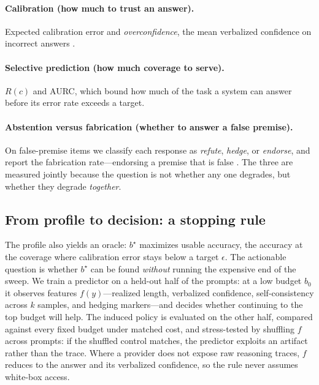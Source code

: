 \documentclass[11pt]{article}
\begin{document}
\paragraph{Calibration (how much to trust an answer).}
Expected calibration error \citep{Guo2017ECE} and \emph{overconfidence}, the
mean verbalized confidence on incorrect answers
\citep{Kadavath2022KnowWhatTheyKnow, Tian2023JustAsk, Xiong2023Confidence}.
\paragraph{Selective prediction (how much coverage to serve).}
$R(c)$ and AURC, which bound how much of the task a system can answer before
its error rate exceeds a target.
\paragraph{Abstention versus fabrication (whether to answer a false premise).}
On false-premise items we classify each response as \emph{refute},
\emph{hedge}, or \emph{endorse}, and report the fabrication rate---endorsing a
premise that is false \citep{Sathyanathan2025Presuppositions,
Kirichenko2025AbstentionBench}.
The three are measured jointly because the question is not whether any one
degrades, but whether they degrade \emph{together}.

\subsection{From profile to decision: a stopping rule}\label{sec:rule}
The profile also yields an oracle: $b^\star$ maximizes usable accuracy, the
accuracy at the coverage where calibration error stays below a target
$\epsilon$.
The actionable question is whether $b^\star$ can be found \emph{without}
running the expensive end of the sweep.
We train a predictor on a held-out half of the prompts: at a low budget $b_0$
it observes features $f(y)$---realized length, verbalized confidence,
self-consistency across $k$ samples, and hedging markers---and decides whether
continuing to the top budget will help.
The induced policy is evaluated on the other half, compared against every
fixed budget under matched cost, and stress-tested by shuffling $f$ across
prompts: if the shuffled control matches, the predictor exploits an artifact
rather than the trace.
Where a provider does not expose raw reasoning traces, $f$ reduces to the
answer and its verbalized confidence, so the rule never assumes white-box
access.
\end{document}
